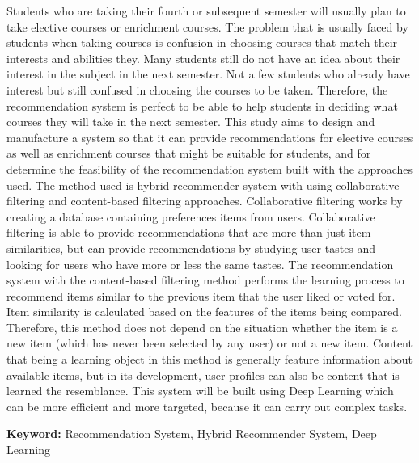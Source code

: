 {Students who are taking their fourth or subsequent semester will usually plan to take elective courses or enrichment courses.
The problem that is usually faced by students when taking courses is confusion in choosing courses that match their interests and abilities
they. Many students still do not have an idea about their interest in the subject in the next semester. Not a few students who already have
interest but still confused in choosing the courses to be taken. Therefore, the recommendation system is perfect to be able to help
students in deciding what courses they will take in the next semester. This study aims to design and manufacture
a system so that it can provide recommendations for elective courses as well as enrichment courses that might be suitable for students, and for
determine the feasibility of the recommendation system built with the approaches used. The method used is hybrid recommender system with
using collaborative filtering and content-based filtering approaches. Collaborative filtering works by creating a database containing preferences items
from users. Collaborative filtering is able to provide recommendations that are more than just item similarities, but can provide recommendations by studying user tastes and
looking for users who have more or less the same tastes. The recommendation system with the content-based filtering method performs the learning process to recommend
items similar to the previous item that the user liked or voted for. Item similarity is calculated based on the features of the items being compared.
Therefore, this method does not depend on the situation whether the item is a new item (which has never been selected by any user) or not a new item. Content that
being a learning object in this method is generally feature information about available items, but in its development, user profiles can also be content that is learned
the resemblance. This system will be built using Deep Learning which can be more efficient and more targeted, because it can carry out complex tasks.

\vspace{6 mm}
\noindent
\textbf{Keyword: }Recommendation System, Hybrid Recommender System, Deep Learning
}



